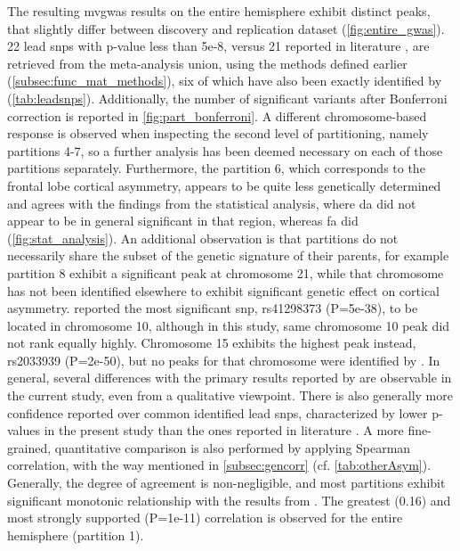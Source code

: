 The resulting \ac{mvgwas} results on the entire hemisphere exhibit distinct peaks, that slightly differ between discovery and replication dataset (\autoref{fig:entire_gwas}). 22 lead \acp{snp} with p-value less than 5e-8, versus 21 reported in literature \cite{Sha2021}, are retrieved from the meta-analysis union, using the methods defined earlier (\autoref{subsec:func_mat_methods}), six of which have also been exactly identified by \citet{Sha2021} (\autoref{tab:leadsnps}). Additionally, the number of significant variants after Bonferroni correction is reported in \autoref{fig:part_bonferroni}. A different chromosome-based response is observed when inspecting the second level of partitioning, namely partitions 4-7, so a further analysis has been deemed necessary on each of those partitions separately. Furthermore, the partition 6, which corresponds to the frontal lobe cortical asymmetry, appears to be quite less genetically determined and agrees with the findings from the statistical analysis, where \ac{da} did not appear to be in general significant in that region, whereas \ac{fa} did (\autoref{fig:stat_analysis}). An additional observation is that partitions do not necessarily share the subset of the genetic signature of their parents, for example partition 8 exhibit a significant peak at chromosome 21, while that chromosome has not been identified elsewhere to exhibit significant genetic effect on cortical asymmetry. \citet{Sha2021} reported the most significant \ac{snp}, rs41298373 (P=5e-38), to be located in chromosome 10, although in this study, same chromosome 10 peak did not rank equally highly. Chromosome 15 exhibits the highest peak instead, rs2033939 (P=2e-50), but no peaks for that chromosome were identified by \citet{Sha2021}. In general, several differences with the primary results reported by \citet{Sha2021} are observable in the current study, even from a qualitative viewpoint. There is also generally more confidence reported over common identified lead \acp{snp}, characterized by lower p-values in the present study than the ones reported in literature \cite{Sha2021}. A more fine-grained, quantitative comparison is also performed by applying Spearman correlation, with the way mentioned in \autoref{subsec:gencorr} \cite{Naqvi2021} (cf. \autoref{tab:otherAsym}). Generally, the degree of agreement is non-negligible, and most partitions exhibit significant monotonic relationship with the results from \citet{Sha2021}. The greatest (0.16) and most strongly supported (P=1e-11) correlation is observed for the entire hemisphere (partition 1).


